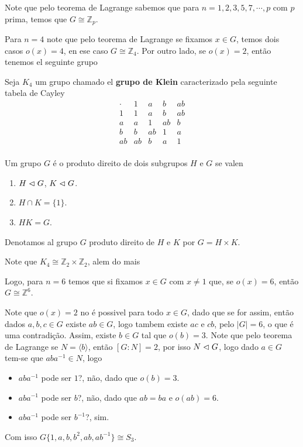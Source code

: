 Note que pelo teorema de Lagrange sabemos que para $n=1,2,3,5,7,\cdots,p$ com $p$ prima, temos que $G\cong \mathbb{Z}_{p}$.

Para $n=4$ note que pelo teorema de Lagrange se fixamos $x\in G$, temos dois casos $o(x)=4$, en ese caso $G\cong \mathbb{Z}_{4}$. Por outro lado, se $o(x)=2$, então tenemos el seguinte grupo
\begin{definition}
  Seja $K_4$ um grupo chamado el \textbf{grupo de Klein} caracterizado pela seguinte tabela de Cayley
  \[
  \begin{array}{c|cccc}
    \cdot & 1 & a & b & ab \\
    \hline
    1 & 1 & a & b & ab \\
    a & a & 1 & ab & b \\
    b & b & ab & 1 & a \\
    ab & ab & b & a & 1 \\
  \end{array}
  \]
\end{definition}
\begin{proposition}
  Um grupo $G$ é o produto direito de dois subgrupos $H$ e $G$ se valen
  \begin{enumerate}
    \item $H\vartriangleleft G$, $K\vartriangleleft G$.
    \item $H\cap K=\{1\}$.
    \item $HK=G$.
  \end{enumerate}
\end{proposition}
\begin{notation}
  Denotamos al grupo $G$ produto direito de $H$ e $K$ por $G=H\times K$.
\end{notation}
\begin{note}
  Note que $K_4\cong \mathbb{Z}_{2}\times \mathbb{Z}_{2}$, alem do mais
  \begin{center}
      
  \end{center}
\end{note}

Logo, para $n=6$ temos que si fixamos $x\in G$ com $x\neq 1$ que, se $o(x)=6$, então $G\cong \mathbb{Z}^{6}$.

Note que $o(x)=2$ no é possivel para  todo $x\in G$, dado que se for assim, então dados $a,b,c\in G$ existe $ab\in G$, logo tambem existe $ac$ e $cb$, pelo $|G|=6$, o que é uma contradição. Assim, existe $b\in G$ tal que $o(b)=3$.
Note que pelo teorema de Lagrange se $N=\langle b \rangle$, então $[G:N]=2$, por isso $N\vartriangleleft G$, logo dado $a\in G$ tem-se que $aba^{-1}\in N$, logo
\begin{itemize}
  \item $aba^{-1}$ pode ser $1$?, não, dado que $o(b)=3$.
  \item $aba^{-1}$ pode ser $b$?, não, dado que $ab=ba$ e $o(ab)=6$.
  \item $aba^{-1}$ pode ser $b^{-1}$?, sim. 
\end{itemize}
Com isso $G\{1,a,b,b^{2},ab,ab^{-1}\}\cong S_3$.

